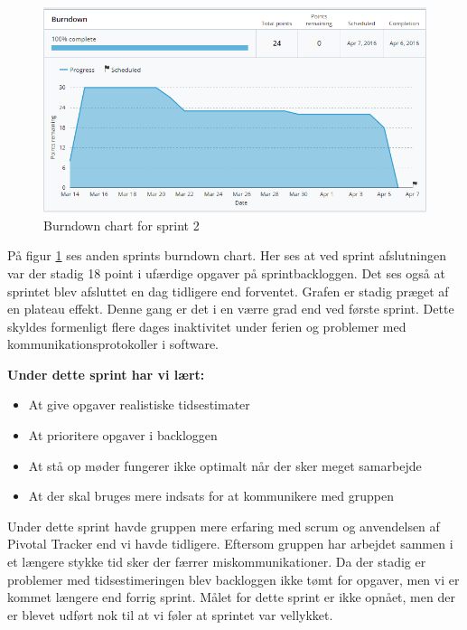 \documentclass[a4paper,oneside,article]{memoir}
\begin{document}
	\begin{figure}[H]
		\centering
		\includegraphics[width=\textwidth]{Projektgennemfoerelse/images/burndown2}
		\caption{Burndown chart for sprint 2}
		\label{ref:Burndown2}
	\end{figure}
	
	På figur \ref{ref:Burndown2} ses anden sprints burndown chart. Her ses at ved sprint afslutningen var der stadig 18 point i ufærdige opgaver på sprintbackloggen. Det ses også at sprintet blev afsluttet en dag tidligere end forventet. Grafen er stadig præget af en plateau effekt. Denne gang er det i en værre grad end ved første sprint. Dette skyldes formenligt flere dages inaktivitet under ferien og problemer med kommunikationsprotokoller i software. \newline 
	
	\textbf{Under dette sprint har vi lært:}
	\begin{itemize}
		\item At give opgaver realistiske tidsestimater
		\item At prioritere opgaver i backloggen
		\item At stå op møder fungerer ikke optimalt når der sker meget samarbejde
		\item At der skal bruges mere indsats for at kommunikere med gruppen 
	\end{itemize}
	
	Under dette sprint havde gruppen mere erfaring med scrum og anvendelsen af Pivotal Tracker end vi havde tidligere. Eftersom gruppen har arbejdet sammen i et længere stykke tid sker der færrer miskommunikationer. Da der stadig er problemer med tidsestimeringen blev backloggen ikke tømt for opgaver, men vi er kommet længere end forrig sprint. Målet for dette sprint er ikke opnået, men der er blevet udført nok til at vi føler at sprintet var vellykket.
	
\end{document}
